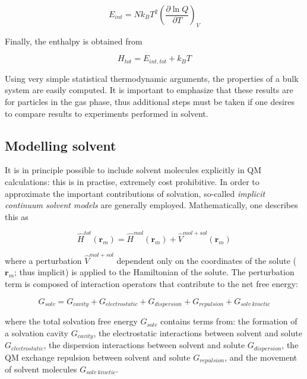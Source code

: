 \begin{doublespace}
\begin{equation}
  E_{int} = Nk_B T^2\left( \frac{\partial \ln Q}{\partial T} \right)_V
\end{equation}

\noindent Finally, the enthalpy is obtained from

\begin{equation}
  H_{tot} = E_{int,tot} + k_B T
\end{equation}

Using very simple statistical thermodynamic arguments, the properties of a bulk
system are easily computed. It is important to emphasize that these results are
for particles in the gas phase, thus additional steps must be taken if one
desires to compare results to experiments performed in solvent.

\subsection{Modelling solvent}

It is in principle possible to include solvent molecules explicitly in QM
calculations: this is in practise, extremely cost prohibitive. In order to
approximate the important contributions of solvation, so-called \emph{implicit
continuum solvent models} are generally employed.\cite{Mennucci2007,Cramer2004}
Mathematically, one describes this as

\begin{equation}
  \hat{H}^{tot}(\mathbf{r}_m) = \hat{H}^{mol}(\mathbf{r}_m) + \hat{V}^{mol+sol}(\mathbf{r}_m)
\end{equation}

\noindent where a perturbation $\hat{V}^{mol+sol}$ dependent only on the
coordinates of the solute ($\mathbf{r}_m$; thus implicit) is applied to the
Hamiltonian of the solute. The perturbation term is composed of interaction
operators that contribute to the net free energy:

\begin{equation}
G_{solv} = G_{cavity} + G_{electrostatic} + G_{dispersion} + G_{repulsion} +
G_{solv~kinetic}
\end{equation}

\noindent where the total solvation free energy $G_{solv}$ contains terms from:
the formation of a solvation cavity $G_{cavity}$, the electrostatic
interactions between solvent and solute $G_{electrostatic}$, the dispersion
interactions between solvent and solute $G_{dispersion}$, the QM exchange
repulsion between solvent and solute $G_{repulsion}$, and the movement of
solvent molecules $G_{solv~kinetic}$.


\end{doublespace}
